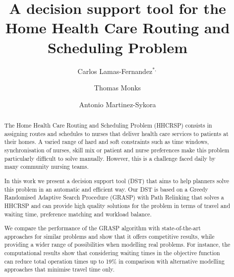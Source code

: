\documentclass[a4paper,11pt]{elsarticle}
\begin{document}
\begin{frontmatter}


\title{A decision support tool for the Home Health Care Routing and Scheduling Problem}

\author[sbs]{Carlos Lamas-Fernandez$^{*,}$}
\author[exeter]{Thomas Monks}
\author[sbs]{Antonio Martinez-Sykora}

\address[sbs]{Southampton Business School, University of Southampton, Southampton SO17 1BJ, UK}
\address[exeter]{University of Exeter Medical School, University of Exeter, Exeter, UK}

\begin{abstract}
The Home Health Care Routing and Scheduling Problem (HHCRSP) consists in assigning routes and schedules to nurses that deliver health care services to patients at their homes. A varied range of hard and soft constraints such as time windows, synchronisation of nurses, skill mix or patient and nurse preferences make this problem particularly difficult to solve manually. However, this is a challenge faced daily by many community nursing teams.

In this work we present a decision support tool (DST) that aims to help planners solve this problem in an automatic and efficient way. Our DST is based on a Greedy Randomised Adaptive Search Procedure (GRASP) with Path Relinking that solves a HHCRSP and can provide high quality solutions for the problem in terms of travel and waiting time, preference matching and workload balance. 


We compare the performance of the GRASP algorithm with state-of-the-art approaches for similar problems and show that it offers competitive results, while providing a wider range of possibilities when modelling real problems. For instance, the computational results show that considering waiting times in the objective function can reduce total operation times up to 19\% in comparison with alternative modelling approaches that minimise travel time only.

\end{abstract}


\end{frontmatter}
\end{document}
